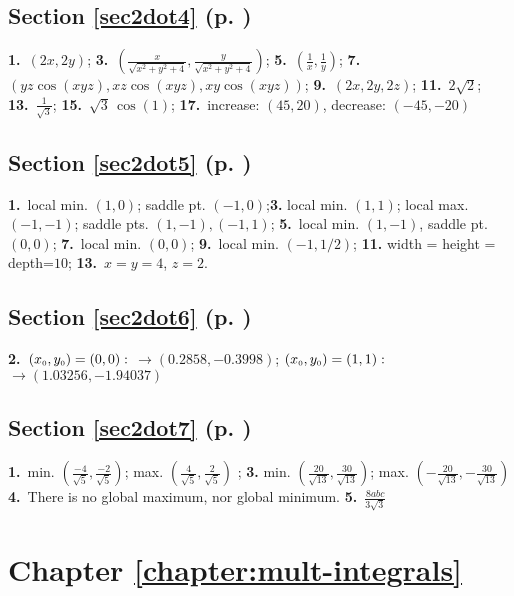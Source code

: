 \begin{multicols}{2}
\subsection*{Section \ref{sec2dot4} (p. \pageref{sec2dot4})}

\textbf{1.}~$(2x,2y)$;
\textbf{3.}~$(\tfrac{x}{\sqrt{x^2 + y^2 + 4}},\tfrac{y}{\sqrt{x^2 + y^2 + 4}})$;
\textbf{5.}~$(\tfrac1x,\tfrac1y)$;\quad
\textbf{7.}~$(yz\cos(xyz),xz\cos(xyz),xy\cos(xyz))$;\quad
\textbf{9.}~$(2x,2y,2z)$;\quad
\textbf{11.}~$2\sqrt{2}$;\quad
\textbf{13.}~$\frac{1}{\sqrt{3}}$;\quad
\textbf{15.}~$\sqrt{3}\,\cos(1)$;\quad
\textbf{17.}~increase: $(45,20)$, decrease: $(-45,-20)$

\subsection*{Section \ref{sec2dot5} (p. \pageref{sec2dot5})}

\textbf{1.}~local min. $(1,0)$; saddle pt. $(-1,0)$;\quad\textbf{3.}
local min. $(1,1)$; local max. $(-1,-1)$; saddle pts. $(1,-1),(-1,1)$;\quad
\textbf{5.}~local min. $(1,-1)$, saddle pt. $(0,0)$;\quad
\textbf{7.}~local min. $(0,0)$;\quad
\textbf{9.}~local min. $(-1,1/2)$;\quad
\textbf{11.}
width = height = depth=$10$;\quad
\textbf{13.}~$x=y=4$, $z=2$.

\subsection*{Section \ref{sec2dot6} (p. \pageref{sec2dot6})}

\textbf{2.}~$(x_{\scriptscriptstyle 0},y_{\scriptscriptstyle 0})=(0,0):$ $\rightarrow (0.2858,-0.3998)$;
$(x_{\scriptscriptstyle 0},y_{\scriptscriptstyle 0})=(1,1):$ $\rightarrow (1.03256,-1.94037)$
\subsection*{Section \ref{sec2dot7} (p. \pageref{sec2dot7})}

\textbf{1.}~min. $\left(\frac{-4}{\sqrt{5}},\frac{-2}{\sqrt{5}}\right)$;
max. $\left(\frac{4}{\sqrt{5}},\frac{2}{\sqrt{5}}\right)$
;\quad
\textbf{3.}
min. $\left(\frac{20}{\sqrt{13}},\frac{30}{\sqrt{13}}\right)$;
max. $\left(-\frac{20}{\sqrt{13}},-\frac{30}{\sqrt{13}}\right)$
\textbf{4.}~There is no global maximum, nor global minimum.
\textbf{5.}~$\frac{8abc}{3\sqrt{3}}$
\section*{Chapter \ref{chapter:mult-integrals}}

\end{multicols}

